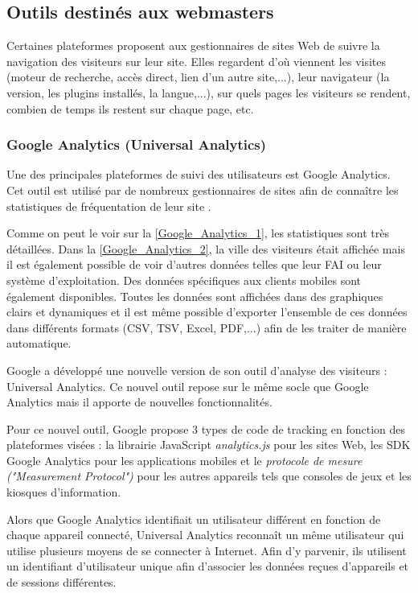 \subsection{Outils destinés aux webmasters}
Certaines plateformes proposent aux gestionnaires de sites Web de suivre la navigation des visiteurs sur leur site. Elles regardent d'où viennent les visites (moteur de recherche, accès direct, lien d'un autre site,...), leur navigateur (la version, les plugins installés, la langue,...), sur quels pages les visiteurs se rendent, combien de temps ils restent sur chaque page, etc.

\subsubsection{Google Analytics (Universal Analytics)}
\label{google_analytics}
Une des principales plateformes de suivi des utilisateurs est Google Analytics. Cet outil est utilisé par de nombreux gestionnaires de sites afin de connaître les statistiques de fréquentation de leur site \cite{javascript_google_analytics}.

Comme on peut le voir sur la \autoref{Google_Analytics_1}, les statistiques sont très détaillées. Dans la \autoref{Google_Analytics_2}, la ville des visiteurs était affichée mais il est également possible de voir d'autres données telles que leur FAI ou leur système d'exploitation. Des données spécifiques aux clients mobiles sont également disponibles. Toutes les données sont affichées dans des graphiques clairs et dynamiques et il est même possible d'exporter l'ensemble de ces données dans différents formats (CSV, TSV, Excel, PDF,...) afin de les traiter de manière automatique.
\newline

Google a développé une nouvelle version de son outil d'analyse des visiteurs : Universal Analytics. Ce nouvel outil repose sur le même socle que Google Analytics mais il apporte de nouvelles fonctionnalités.

Pour ce nouvel outil, Google propose 3 types de code de tracking en fonction des plateformes visées : la librairie JavaScript \textit{analytics.js} pour les sites Web, les SDK Google Analytics pour les applications mobiles et le \textit{protocole de mesure ("Measurement Protocol")} pour les autres appareils tels que consoles de jeux et les kiosques d'information.
\newline

Alors que Google Analytics identifiait un utilisateur différent en fonction de chaque appareil connecté, Universal Analytics reconnaît un même utilisateur qui utilise plusieurs moyens de se connecter à Internet. Afin d'y parvenir, ils utilisent un identifiant d'utilisateur unique afin d'associer les données reçues d'appareils et de sessions différentes.

